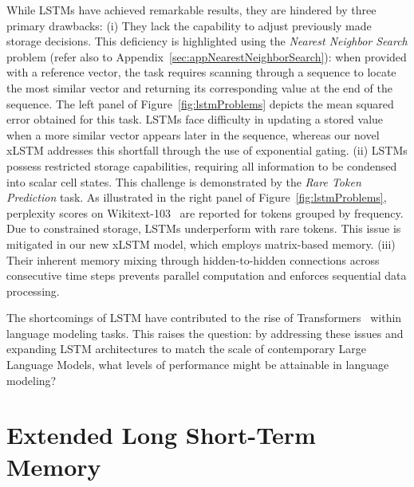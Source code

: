 While LSTMs have achieved remarkable results, they are hindered by three primary drawbacks: (i) They lack the capability to adjust previously made storage decisions. This deficiency is highlighted using the {\it Nearest Neighbor Search} problem (refer also to Appendix~\ref{sec:appNearestNeighborSearch}): when provided with a reference vector, the task requires scanning through a sequence to locate the most similar vector and returning its corresponding value at the end of the sequence. The left panel of Figure~\ref{fig:lstmProblems} depicts the mean squared error obtained for this task. LSTMs face difficulty in updating a stored value when a more similar vector appears later in the sequence, whereas our novel xLSTM addresses this shortfall through the use of exponential gating. (ii) LSTMs possess restricted storage capabilities, requiring all information to be condensed into scalar cell states. This challenge is demonstrated by the {\it Rare Token Prediction} task. As illustrated in the right panel of Figure~\ref{fig:lstmProblems}, perplexity scores on Wikitext-103~\citep{Merity:17} are reported for tokens grouped by frequency. Due to constrained storage, LSTMs underperform with rare tokens. This issue is mitigated in our new xLSTM model, which employs matrix-based memory. (iii) Their inherent memory mixing through hidden-to-hidden connections across consecutive time steps prevents parallel computation and enforces sequential data processing.

The shortcomings of LSTM have contributed to the rise of Transformers~\citep{Vaswani:17} within language modeling tasks. This raises the question: by addressing these issues and expanding LSTM architectures to match the scale of contemporary Large Language Models, what levels of performance might be attainable in language modeling?

\section{Extended Long Short-Term Memory}
\label{sec:xLSTM}

